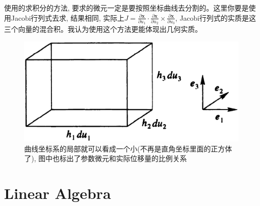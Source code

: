 使用的求积分的方法, 要求的微元一定是要按照坐标曲线去分割的。这里你要是使用Jacobi行列式去求, 结果相同, 实际上$J=\frac{\partial \bm{x}}{\partial u_1}\cdot
\frac{\partial \bm{x}}{\partial u_2}\times\frac{\partial \bm{x}}{\partial u_3}$, Jacobi行列式的实质是这三个向量的混合积。我认为使用这个方法更能体现出几何实质。
\begin{figure}[htbp]
    \centering
    \includegraphics[scale=0.26]{fig/a-2.eps}
    \caption{曲线坐标系的局部就可以看成一个小(不再是直角坐标里面的正方体了), 图中也标出了参数微元和实际位移量的比例关系}
\end{figure}
\chapter{Linear Algebra}

